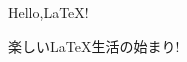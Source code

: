 \documentclass[a4paper]{jsarticle}
\begin{document}
Hello,\LaTeX !

楽しい\LaTeX 生活の始まり!
\end{document}
